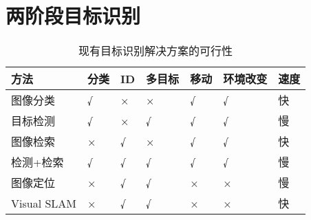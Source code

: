 \chapter{两阶段目标识别}
\label{chap:fast}
\begin{table}[htbp]
    \centering
    \caption{\label{table:methods}现有目标识别解决方案的可行性}
    \begin{tabular}{|l|l|l|l|l|l|l|}\hline
    方法 &
      分类 &
      ID &
      多目标 &
      移动 &
      环境改变 &
      速度 \\
      \hline 图像分类\cite{he2019bag} &
      {\color[HTML]{355421} √} &
      {\color[HTML]{BF0000} ×} &
      {\color[HTML]{BF0000} ×} &
      {\color[HTML]{355421} √} &
      {\color[HTML]{355421} √} &
      {\color[HTML]{355421} 快} \\ \hline
    目标检测\cite{zou2019object} &
      {\color[HTML]{355421} √} &
      {\color[HTML]{BF0000} ×} &
      {\color[HTML]{355421} √} &
      {\color[HTML]{355421} √} &
      {\color[HTML]{355421} √} &
      {\color[HTML]{BF0000} 慢} \\ \hline
    图像检索\cite{philbin2008lost,zheng2017sift} &
      {\color[HTML]{BF0000} ×} &
      {\color[HTML]{355421} √} &
      {\color[HTML]{BF0000} ×} &
      {\color[HTML]{355421} √} &
      {\color[HTML]{355421} √} &
      {\color[HTML]{355421} 快} \\ \hline
    检测+检索 &
      {\color[HTML]{355421} √} &
      {\color[HTML]{355421} √} &
      {\color[HTML]{355421} √} &
      {\color[HTML]{355421} √} &
      {\color[HTML]{355421} √} &
      {\color[HTML]{BF0000} 慢} \\ \hline
    图像定位\cite{sattler2011fast} &
      {\color[HTML]{BF0000} ×} &
      {\color[HTML]{355421} √} &
      {\color[HTML]{355421} √} &
      {\color[HTML]{BF0000} ×} &
      {\color[HTML]{BF0000} ×} &
      {\color[HTML]{BF0000} 慢} \\ \hline
    Visual SLAM\cite{liu2021edgesharing} &
      {\color[HTML]{BF0000} ×} &
      {\color[HTML]{355421} √} &
      {\color[HTML]{355421} √} &
      {\color[HTML]{BF0000} ×} &
      {\color[HTML]{BF0000} ×} &
      {\color[HTML]{355421} 快} \\ \hline
    \end{tabular}
  \end{table}


